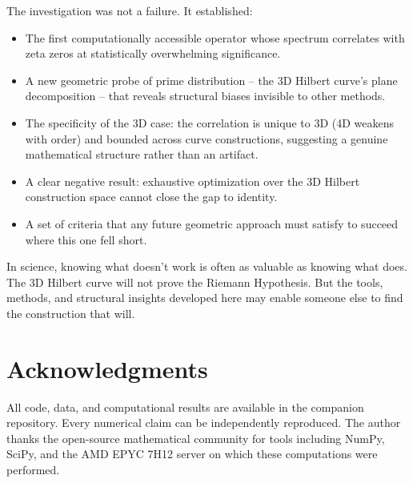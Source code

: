 \documentclass[11pt,a4paper]{article}
\begin{document}
The investigation was not a failure.  It established:

\begin{itemize}
\item The first computationally accessible operator whose spectrum
   correlates with zeta zeros at statistically overwhelming significance.

\item A new geometric probe of prime distribution -- the 3D Hilbert
   curve's plane decomposition -- that reveals structural biases
   invisible to other methods.

\item The specificity of the 3D case: the correlation is unique to 3D
   (4D weakens with order) and bounded across curve constructions,
   suggesting a genuine mathematical structure rather than an artifact.

\item A clear negative result: exhaustive optimization over the 3D
   Hilbert construction space cannot close the gap to identity.

\item A set of criteria that any future geometric approach must satisfy
   to succeed where this one fell short.
\end{itemize}

In science, knowing what doesn't work is often as valuable as knowing
what does.  The 3D Hilbert curve will not prove the Riemann Hypothesis.
But the tools, methods, and structural insights developed here may
enable someone else to find the construction that will.

\section{Acknowledgments}

All code, data, and computational results are available in the companion
repository.  Every numerical claim can be independently reproduced.  The
author thanks the open-source mathematical community for tools including
NumPy, SciPy, and the AMD EPYC 7H12 server on which these computations
were performed.
\end{document}
